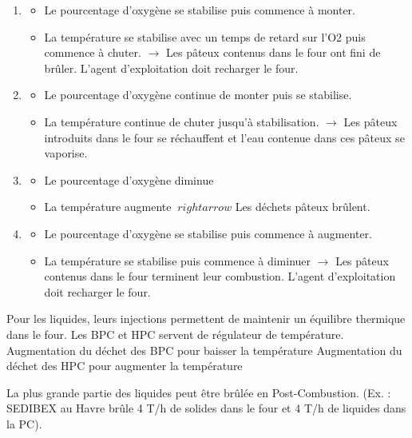 \begin{enumerate}
\item 
    \begin{itemize} 
    \item Le pourcentage d’oxygène se stabilise puis commence à monter.
    \item La température se stabilise avec un temps de retard sur l’O2 puis commence à chuter.
		$\rightarrow$ Les pâteux contenus dans le four ont fini de brûler.
		L’agent d’exploitation doit recharger le four.
    \end{itemize}

\item 
    \begin{itemize} 
    \item Le pourcentage d’oxygène continue de monter puis se stabilise.
	\item La température continue de chuter jusqu’à stabilisation.
	$\rightarrow$  Les pâteux introduits dans le four se réchauffent et l’eau contenue dans ces pâteux se vaporise.
    \end{itemize}

\item 
    \begin{itemize} 	
    \item Le pourcentage d’oxygène diminue
	\item La température augmente $\ rightarrow$ Les déchets pâteux brûlent.
    \end{itemize}

\item 
    \begin{itemize} 

	\item Le pourcentage d’oxygène se stabilise puis commence à augmenter.
	\item La température se stabilise puis commence à diminuer
		$\rightarrow$ Les pâteux contenus dans le four terminent leur combustion.
		L’agent d’exploitation doit recharger le four.
    \end{itemize}
\end{enumerate}

Pour les liquides, leurs injections permettent de maintenir un équilibre thermique dans le four. Les BPC et HPC servent de régulateur de température.
	Augmentation du déchet des BPC pour baisser la température
	Augmentation du déchet des HPC pour augmenter la température

La plus grande partie des liquides peut être brûlée en Post-Combustion. (Ex. : SEDIBEX au Havre brûle 4 T/h de solides dans le four et 4 T/h de liquides dans la PC).


